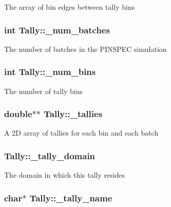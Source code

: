 The array of bin edges between tally bins \hypertarget{classTally_ab9e3d1f11d71a62d51872cff0e70051d}{
\subsubsection[{\-\_\-num\-\_\-batches}]{\setlength{\rightskip}{0pt plus 5cm}int Tally\-::\-\_\-num\-\_\-batches\hspace{0.3cm}{\ttfamily [protected]}}}\label{classTally_ab9e3d1f11d71a62d51872cff0e70051d}
The number of batches in the P\-I\-N\-S\-P\-E\-C simulation \hypertarget{classTally_a2f4828eaf5d1de0b4d8aefd7c62171e6}{
\subsubsection[{\-\_\-num\-\_\-bins}]{\setlength{\rightskip}{0pt plus 5cm}int Tally\-::\-\_\-num\-\_\-bins\hspace{0.3cm}{\ttfamily [protected]}}}\label{classTally_a2f4828eaf5d1de0b4d8aefd7c62171e6}
The number of tally bins \hypertarget{classTally_ae590e52cd88360d5fb37cc22fe0631d6}{
\subsubsection[{\-\_\-tallies}]{\setlength{\rightskip}{0pt plus 5cm}double$\ast$$\ast$ Tally\-::\-\_\-tallies\hspace{0.3cm}{\ttfamily [protected]}}}\label{classTally_ae590e52cd88360d5fb37cc22fe0631d6}
A 2\-D array of tallies for each bin and each batch \hypertarget{classTally_af7eb5cc6844eb1081ac5725334d90071}{
\subsubsection[{\-\_\-tally\-\_\-domain}]{ Tally\-::\-\_\-tally\-\_\-domain\hspace{0.3cm}{\ttfamily [protected]}}}\label{classTally_af7eb5cc6844eb1081ac5725334d90071}
The domain in which this tally resides \hypertarget{classTally_aafa6cfec6391cb1e6247251a6ca7d8ff}{
\subsubsection[{\-\_\-tally\-\_\-name}]{\setlength{\rightskip}{0pt plus 5cm}char$\ast$ Tally\-::\-\_\-tally\-\_\-name\hspace{0.3cm}{\ttfamily [protected]}}}\label{classTally_aafa6cfec6391cb1e6247251a6ca7d8ff}
